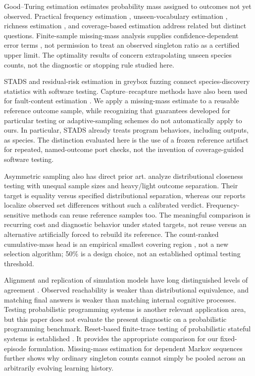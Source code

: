 \documentclass[10pt,letterpaper]{article}
\begin{document}
Good--Turing estimation \citep{ref8} estimates probability mass assigned to outcomes not
yet observed. Practical frequency estimation \citep{ref9}, unseen-vocabulary estimation
\citep{ref11}, richness estimation \citep{ref12}, and coverage-based estimation
\citep{ref30} address related but distinct questions. Finite-sample missing-mass analysis
supplies confidence-dependent error terms \citep{ref10}, not permission to treat an
observed singleton ratio as a certified upper limit. The optimality results of
\citet{ref29} concern extrapolating unseen species counts, not the diagnostic or stopping
rule studied here.

STADS \citep{ref13} and residual-risk estimation in greybox fuzzing \citep{ref14} connect
species-discovery statistics with software testing. Capture--recapture methods have also
been used for fault-content estimation \citep{ref25}. We apply a missing-mass estimate to
a reusable reference outcome sample, while recognizing that guarantees developed for
particular testing or adaptive-sampling schemes do not automatically apply to ours. In
particular, STADS already treats program behaviors, including outputs, as species. The
distinction evaluated here is the use of a frozen reference artifact for repeated,
named-outcome port checks, not the invention of coverage-guided software testing.

Asymmetric sampling also has direct prior art. \citet{ref32} analyze distributional
closeness testing with unequal sample sizes and heavy/light outcome separation. Their
target is equality versus specified distributional separation, whereas our reports
localize observed set differences without such a calibrated verdict. Frequency-sensitive
methods can reuse reference samples too. The meaningful comparison is recurring cost and
diagnostic behavior under stated targets, not reuse versus an alternative artificially
forced to rebuild its reference. The count-ranked cumulative-mass head is an empirical
smallest covering region \citep{ref33}, not a new selection algorithm; 50\% is a design
choice, not an established optimal testing threshold.

Alignment and replication of simulation models have long distinguished levels of agreement
\citep{ref19, ref20}. Observed reachability is weaker than distributional equivalence, and
matching final answers is weaker than matching internal cognitive processes. Testing
probabilistic programming systems \citep{ref18} is another relevant application area, but
this paper does not evaluate the present diagnostic on a probabilistic programming
benchmark. Reset-based finite-trace testing of probabilistic stateful systems is
established \citep{ref34}. It provides the appropriate comparison for our fixed-episode
formulation. Missing-mass estimation for dependent Markov sequences \citep{ref35} further
shows why ordinary singleton counts cannot simply be pooled across an arbitrarily evolving
learning history.
\end{document}
